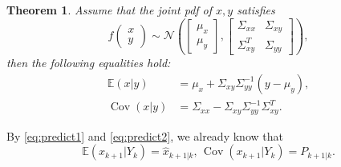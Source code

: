 \documentclass{article}
\newtheorem{theorem}{Theorem}
\DeclareMathOperator{\Cov}{Cov}
\begin{document}
\begin{enumerate}
    \begin{theorem}
      Assume that the joint pdf of $x,y$ satisfies
      \begin{displaymath}
	f\begin{pmatrix}x\\y\end{pmatrix}\sim\mathcal N\left(\begin{bmatrix}\mu_x\\ \mu_y\end{bmatrix},\begin{bmatrix}\Sigma_{xx}&\Sigma_{xy}\\ \Sigma_{xy}^T&\Sigma_{yy}\end{bmatrix}  \right),
      \end{displaymath}
      then the following equalities hold:
      \begin{align*}
	\mathbb E(x|y) &= \mu_x + \Sigma_{xy}\Sigma_{yy}^{-1} (y - \mu_y),\\
	\Cov(x|y) &= \Sigma_{xx} - \Sigma_{xy}\Sigma_{yy}^{-1}\Sigma_{xy}^T.
      \end{align*}
      \label{thm:conditionalgaussian}
    \end{theorem}

    By \eqref{eq:predict1} and \eqref{eq:predict2}, we already know that
    \begin{displaymath}
      \mathbb E(x_{k+1}|Y_k) = \hat x_{k+1|k},\, \Cov(x_{k+1}|Y_k) = P_{k+1|k}.
    \end{displaymath}


\end{enumerate}
\end{document}
